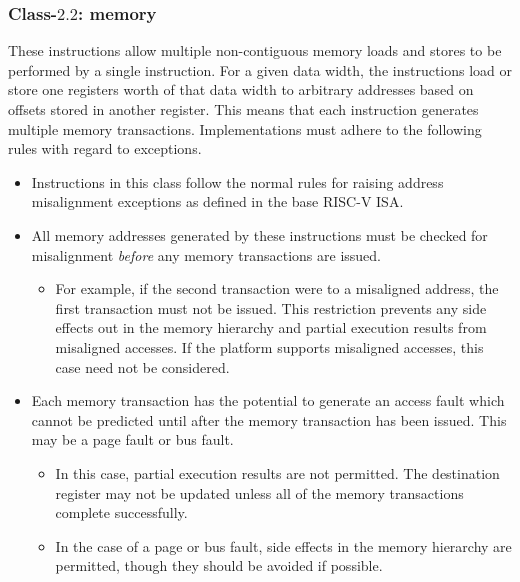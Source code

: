 




\subsubsection{Class-$2.2$: memory}
\label{sec:spec:instruction:2:2}

These instructions allow multiple non-contiguous memory loads and stores
to be performed by a single instruction.
For a given data width, the instructions load or store one registers
worth of that data width to arbitrary addresses based on offsets stored
in another register.
This means that each instruction generates multiple memory transactions.
Implementations must adhere to the following rules with regard
to exceptions.
\begin{itemize}
\item Instructions in this class follow the normal rules for raising
    address misalignment exceptions as defined in the base RISC-V ISA.
\item All memory addresses generated by these instructions must
    be checked for misalignment {\em before} any memory transactions are
    issued.
\begin{itemize} \item
    For example, if the second transaction were to a misaligned address,
    the first transaction must not be issued.
    This restriction prevents any side effects out in the memory hierarchy
    and partial execution results from misaligned accesses.
    If the platform supports misaligned accesses, this case need not
    be considered.
\end{itemize}
\item Each memory transaction has the potential to generate an access
    fault which cannot be predicted until after the memory transaction
    has been issued.
    This may be a page fault or bus fault.
\begin{itemize}
\item In this case, partial execution results are not permitted.
    The destination register may not be updated unless all of the
    memory transactions complete successfully.
\item In the case of a page or bus fault, side effects in the
    memory hierarchy are permitted, though they should be avoided if
    possible.
\end{itemize}
\end{itemize}

